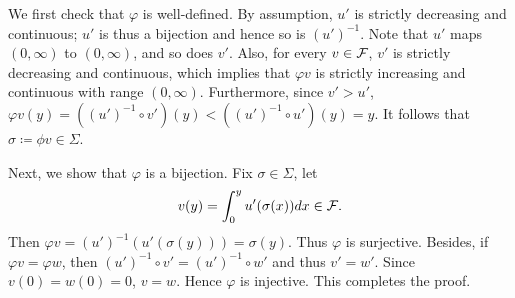 \documentclass[12pt]{article}
\begin{document}
\begin{pf}
    We first check that $\varphi$ is well-defined. By 
    assumption, $u'$ is strictly decreasing and continuous; 
    $u'$ is thus a bijection and hence so is $(u')^{-1}$. Note 
    that $u'$ maps $(0, \infty)$ to $(0, \infty)$, and so 
    does $v'$. Also, for every $v\in\mathcal{F}$, $v'$ is strictly 
    decreasing and continuous, which implies that $\varphi v$ 
    is strictly increasing and continuous with range 
    $(0, \infty)$. Furthermore, since $v'>u'$, $\varphi v(y) 
    = ((u')^{-1}\circ v')(y)<((u')^{-1}\circ u')(y) = y$. It 
    follows that $\sigma\coloneqq\phi v\in\Sigma$. 

    Next, we show that $\varphi$ is a bijection. Fix 
    $\sigma\in\Sigma$, let 
    \begin{equation}
        v(y) = \int_{0}^{y} u'(\sigma(x)) dx \in \mathcal{F}.
    \end{equation}
    Then $\varphi v = (u')^{-1}(u'(\sigma(y))) = \sigma(y)$. 
    Thus $\varphi$ is surjective. Besides, if $\varphi v = 
    \varphi w$, then $(u')^{-1}\circ v' = (u')^{-1}\circ w'$ 
    and thus $v' = w'$. Since $v(0) = w(0) = 0$, $v = w$. 
    Hence $\varphi$ is injective. This completes the proof. 
\end{pf}
\end{document}
